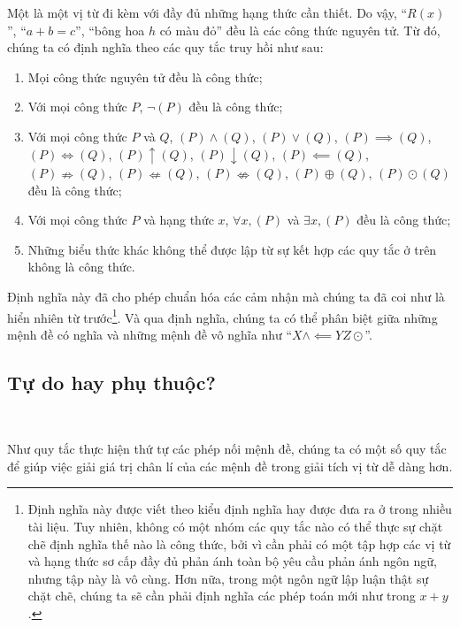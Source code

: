 Một  là một vị từ đi kèm với đầy đủ những hạng thức cần thiết. Do vậy, ``$R(x)$'', ``$a + b = c$'', ``bông hoa $h$ có màu đỏ'' đều là các công thức nguyên tử. Từ đó, chúng ta có định nghĩa  theo các quy tắc truy hồi như sau:
\begin{enumerate}
    \item Mọi công thức nguyên tử đều là công thức;
    \item Với mọi công thức $P$, $\neg (P)$ đều là công thức;
    \item Với mọi công thức $P$ và $Q$, $(P) \land (Q)$, $(P) \lor (Q)$, $(P) \implies (Q)$, $(P) \iff (Q)$, $(P) \uparrow (Q)$, $(P) \downarrow (Q)$, $(P) \impliedby (Q)$, $(P) \nRightarrow (Q)$, $(P) \nLeftarrow (Q)$, $(P) \nLeftrightarrow (Q)$, $(P) \oplus (Q)$, $(P) \odot (Q)$ đều là công thức;
    \item Với mọi công thức $P$ và hạng thức $x$, $\forall x, (P)$ và $\exists x, (P)$ đều là công thức;
    \item Những biểu thức khác không thể được lập từ sự kết hợp các quy tắc ở trên không là công thức.
\end{enumerate}
Định nghĩa này đã cho phép chuẩn hóa các cảm nhận mà chúng ta đã coi như là hiển nhiên từ trước\footnote{Định nghĩa này được viết theo kiểu định nghĩa hay được đưa ra ở trong nhiều tài liệu. Tuy nhiên, không có một nhóm các quy tắc nào có thể thực sự chặt chẽ định nghĩa thế nào là công thức, bởi vì cần phải có một tập hợp các vị từ và hạng thức sơ cấp đầy đủ phản ánh toàn bộ yêu cầu phản ánh ngôn ngữ, nhưng tập này là vô cùng. Hơn nữa, trong một ngôn ngữ lập luận thật sự chặt chẽ, chúng ta sẽ cần phải định nghĩa các phép toán mới như trong $x+y$.}. Và qua định nghĩa, chúng ta có thể phân biệt giữa những mệnh đề có nghĩa và những mệnh đề vô nghĩa như ``$X \land \impliedby Y Z\odot$''.

\subsection{Tự do hay phụ thuộc?}

\ 

Như quy tắc thực hiện thứ tự các phép nối mệnh đề, chúng ta có một số quy tắc để giúp việc giải giá trị chân lí của các mệnh đề trong giải tích vị từ dễ dàng hơn.

